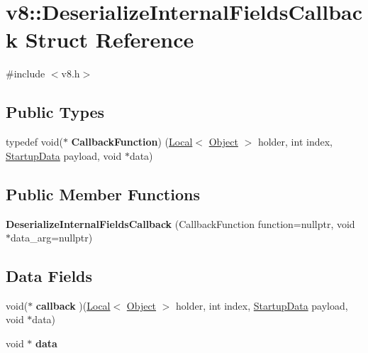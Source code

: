 \hypertarget{structv8_1_1DeserializeInternalFieldsCallback}{}\section{v8\+:\+:Deserialize\+Internal\+Fields\+Callback Struct Reference}
\label{structv8_1_1DeserializeInternalFieldsCallback}


{\ttfamily \#include $<$v8.\+h$>$}

\subsection*{Public Types}
\begin{DoxyCompactItemize}
\item 
\mbox{\label{structv8_1_1DeserializeInternalFieldsCallback_a3c407d887c4152824274df536ce3890d}} 
typedef void($\ast$ {\bfseries Callback\+Function}) (\mbox{\hyperlink{classv8_1_1Local}{Local}}$<$ \mbox{\hyperlink{classv8_1_1Object}{Object}} $>$ holder, int index, \mbox{\hyperlink{classv8_1_1StartupData}{Startup\+Data}} payload, void $\ast$data)
\end{DoxyCompactItemize}
\subsection*{Public Member Functions}
\begin{DoxyCompactItemize}
\item 
\mbox{\label{structv8_1_1DeserializeInternalFieldsCallback_a8888cd62b0decf9052f132eb00d88a0f}} 
{\bfseries Deserialize\+Internal\+Fields\+Callback} (Callback\+Function function=nullptr, void $\ast$data\+\_\+arg=nullptr)
\end{DoxyCompactItemize}
\subsection*{Data Fields}
\begin{DoxyCompactItemize}
\item 
\mbox{\label{structv8_1_1DeserializeInternalFieldsCallback_ae6ed15ca92db4b4d75ceb0984e33d3fa}} 
void($\ast$ {\bfseries callback} )(\mbox{\hyperlink{classv8_1_1Local}{Local}}$<$ \mbox{\hyperlink{classv8_1_1Object}{Object}} $>$ holder, int index, \mbox{\hyperlink{classv8_1_1StartupData}{Startup\+Data}} payload, void $\ast$data)
\item 
\mbox{\label{structv8_1_1DeserializeInternalFieldsCallback_a7fd6b9dfc9e50e6b0429da860569e27f}} 
void $\ast$ {\bfseries data}
\end{DoxyCompactItemize}


